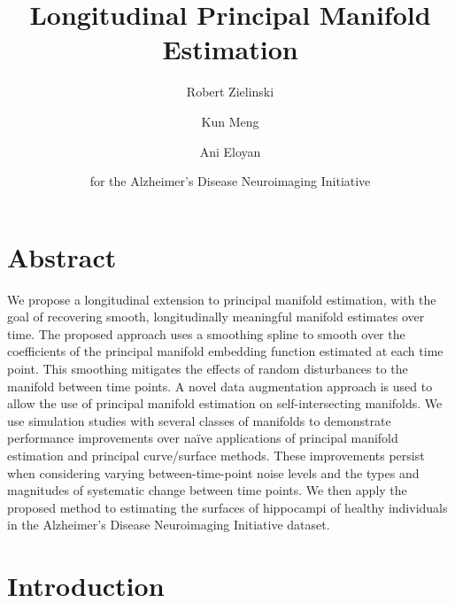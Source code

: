 \documentclass[11pt,reqno]{article}
\theoremstyle{definition}
\begin{document}
\title{Longitudinal Principal Manifold Estimation}
\author[1]{Robert Zielinski}
\author[2]{Kun Meng}
\author[1]{Ani Eloyan}
\author[*]{for the Alzheimer’s Disease Neuroimaging Initiative}



\maketitle

\doublespacing

\section*{Abstract}

We propose a longitudinal extension to principal manifold estimation, with the goal of recovering smooth, longitudinally meaningful manifold estimates over time. The proposed approach uses a smoothing spline to smooth over the coefficients of the principal manifold embedding function estimated at each time point. This smoothing mitigates the effects of random disturbances to the manifold between time points. A novel data augmentation approach is used to allow the use of principal manifold estimation on self-intersecting manifolds. We use simulation studies with several classes of manifolds to demonstrate performance improvements over naïve applications of principal manifold estimation and principal curve/surface methods. These improvements persist when considering varying between-time-point noise levels and the types and magnitudes of systematic change between time points. We then apply the proposed method to estimating the surfaces of hippocampi of healthy individuals in the Alzheimer’s Disease Neuroimaging Initiative dataset.

\section{Introduction}
\end{document}
